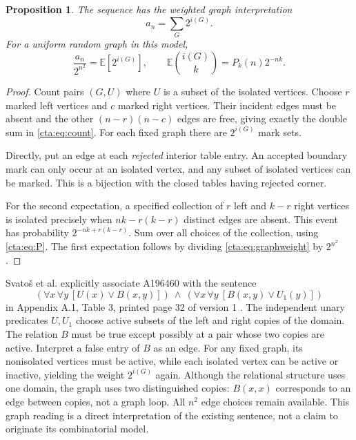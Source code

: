 \documentclass[11pt]{article}
\newtheorem{proposition}[theorem]{Proposition}
\theoremstyle{definition}
\theoremstyle{remark}
\newcommand{\E}{\mathbb E}
\begin{document}
\begin{proposition}\label{cta:prop:graphs}
The sequence has the weighted graph interpretation
\begin{equation}\label{cta:eq:graphweight}
 a_n=\sum_G2^{i(G)}.
\end{equation}
For a uniform random graph in this model,
\begin{equation}\label{cta:eq:expectation}
 \frac{a_n}{2^{n^2}}=\E[2^{i(G)}],\qquad
 \E\binom{i(G)}k=P_k(n)2^{-nk}.
\end{equation}
\end{proposition}
\begin{proof}
Count pairs $(G,U)$ where $U$ is a subset of the isolated vertices.
Choose $r$ marked left vertices and $c$ marked right vertices. Their incident
edges must be absent and the other $(n-r)(n-c)$ edges are free, giving
exactly the double sum in \eqref{cta:eq:count}. For each fixed graph there are
$2^{i(G)}$ mark sets.

Directly, put an edge at each \emph{rejected} interior table entry. An
accepted boundary mark can only occur at an isolated vertex, and any
subset of isolated vertices can be marked. This is a bijection with the
closed tables having rejected corner.

For the second expectation, a specified collection of $r$ left and $k-r$
right vertices is isolated precisely when $nk-r(k-r)$ distinct edges
are absent. This event has probability $2^{-nk+r(k-r)}$. Sum over all
choices of the collection, using \eqref{cta:eq:P}. The first expectation
follows by dividing \eqref{cta:eq:graphweight} by $2^{n^2}$.
\end{proof}

Svato\v{s} et al. explicitly associate A196460 with the sentence
\begin{equation}\label{cta:eq:relational}
 (\forall x\,\forall y\ [U(x)\lor B(x,y)])\ \land\
 (\forall x\,\forall y\ [B(x,y)\lor U_1(y)])
\end{equation}
in Appendix A.1, Table 3, printed page 32 of version 1 \cite{svatos}.
The independent unary predicates $U,U_1$ choose active subsets of the
left and right copies of the domain. The relation $B$ must be true
except possibly at a pair whose two copies are active. Interpret a false
entry of $B$ as an edge. For any fixed graph, its nonisolated vertices
must be active, while each isolated vertex can be active or inactive,
yielding the weight $2^{i(G)}$ again. Although the relational structure
uses one domain, the graph uses two distinguished copies: $B(x,x)$
corresponds to an edge between copies, not a graph loop. All $n^2$ edge
choices remain available. This graph reading is a direct interpretation
of the existing sentence, not a claim to originate its combinatorial model.
\end{document}
